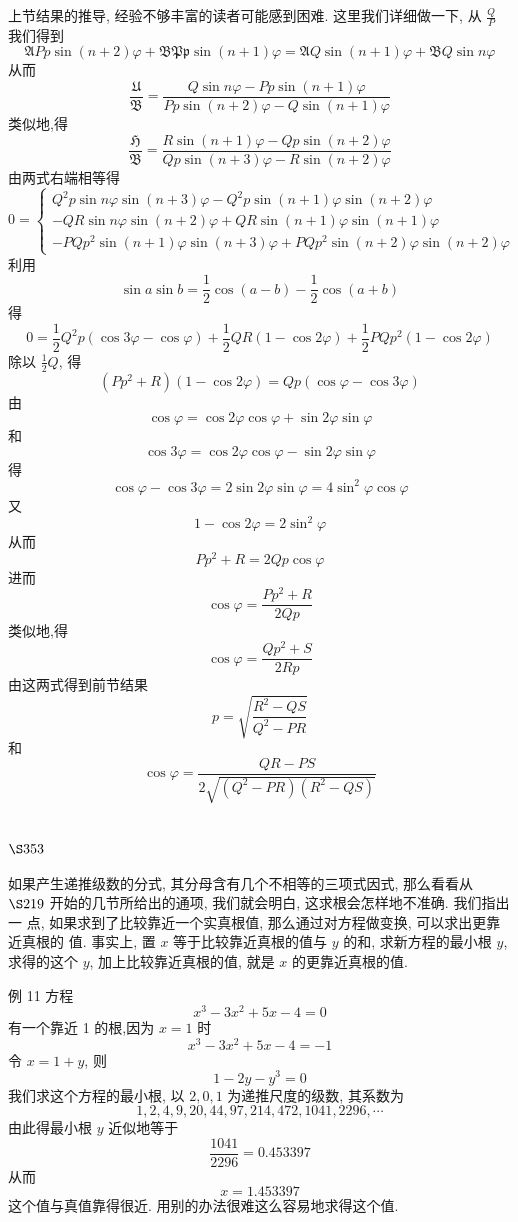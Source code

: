 上节结果的推导, 经验不够丰富的读者可能感到困难. 这里我们详细做一下, 从 $\frac{Q}{P}$ 我们得到
\[
\mathfrak{A} P p \sin (n+2) \varphi+\mathfrak{B P p} \sin (n+1) \varphi=\mathfrak{A} Q \sin (n+1) \varphi+\mathfrak{B} Q \sin n \varphi
\]
从而
\[
\frac{\mathfrak{U}}{\mathfrak{B}}=\frac{Q \sin n \varphi-P p \sin (n+1) \varphi}{P p \sin (n+2) \varphi-Q \sin (n+1) \varphi}
\]
类似地,得
\[
\frac{\mathfrak{H}}{\mathfrak{B}}=\frac{R \sin (n+1) \varphi-Q p \sin (n+2) \varphi}{Q p \sin (n+3) \varphi-R \sin (n+2) \varphi}
\]
由两式右端相等得
\[
0=\left\{\begin{array}{l}
Q^{2} p \sin n \varphi \sin (n+3) \varphi-Q^{2} p \sin (n+1) \varphi \sin (n+2) \varphi \\
-Q R \sin n \varphi \sin (n+2) \varphi+Q R \sin (n+1) \varphi \sin (n+1) \varphi \\
-P Q p^{2} \sin (n+1) \varphi \sin (n+3) \varphi+P Q p^{2} \sin (n+2) \varphi \sin (n+2) \varphi
\end{array}\right.
\]
利用
\[
\sin a \sin b=\frac{1}{2} \cos (a-b)-\frac{1}{2} \cos (a+b)
\]
得
\[
0=\frac{1}{2} Q^{2} p(\cos 3 \varphi-\cos \varphi)+\frac{1}{2} Q R(1-\cos 2 \varphi)+\frac{1}{2} P Q p^{2}(1-\cos 2 \varphi)
\]
除以 $\frac{1}{2} Q$, 得
\[
\left(P p^{2}+R\right)(1-\cos 2 \varphi)=Q p(\cos \varphi-\cos 3 \varphi)
\]
由
\[
\cos \varphi=\cos 2 \varphi \cos \varphi+\sin 2 \varphi \sin \varphi
\]
和
\[
\cos 3 \varphi=\cos 2 \varphi \cos \varphi-\sin 2 \varphi \sin \varphi
\]
得
\[
\cos \varphi-\cos 3 \varphi=2 \sin 2 \varphi \sin \varphi=4 \sin ^{2} \varphi \cos \varphi
\]
又
\[
1-\cos 2 \varphi=2 \sin ^{2} \varphi
\]
从而
\[
P p^{2}+R=2 Q p \cos \varphi
\]
进而
\[
\cos \varphi=\frac{P p^{2}+R}{2 Q p}
\]
类似地,得
\[
\cos \varphi=\frac{Q p^{2}+S}{2 R p}
\]
由这两式得到前节结果
\[
p=\sqrt{\frac{R^{2}-Q S}{Q^{2}-P R}}
\]
和
\[
\cos \varphi=\frac{Q R-P S}{2 \sqrt{\left(Q^{2}-P R\right)\left(R^{2}-Q S\right)}}
\]
\section{$\S 353$}

如果产生递推级数的分式, 其分母含有几个不相等的三项式因式, 那么看看从 $\S 219$ 开始的几节所给出的通项, 我们就会明白, 这求根会怎样地不准确. 我们指出一 点, 如果求到了比较靠近一个实真根值, 那么通过对方程做变换, 可以求出更靠近真根的 值. 事实上, 置 $x$ 等于比较靠近真根的值与 $y$ 的和, 求新方程的最小根 $y$, 求得的这个 $y$, 加上比较靠近真根的值, 就是 $x$ 的更靠近真根的值.

例 11 方程
\[
x^{3}-3 x^{2}+5 x-4=0
\]
有一个靠近 1 的根,因为 $x=1$ 时
\[
x^{3}-3 x^{2}+5 x-4=-1
\]
令 $x=1+y$, 则
\[
1-2 y-y^{3}=0
\]
我们求这个方程的最小根, 以 $2,0,1$ 为递推尺度的级数, 其系数为
\[
1,2,4,9,20,44,97,214,472,1041,2296, \cdots
\]
由此得最小根 $y$ 近似地等于
\[
\frac{1041}{2296}=0.453397
\]
从而
\[
x=1.453397
\]
这个值与真值靠得很近. 用别的办法很难这么容易地求得这个值.

